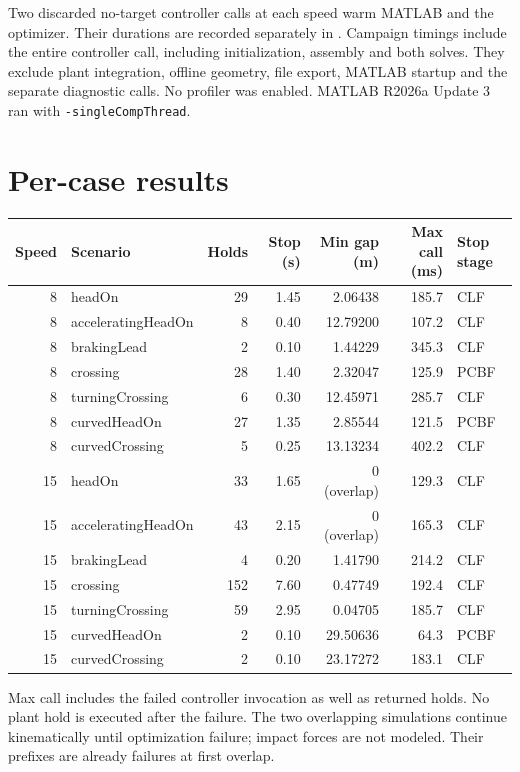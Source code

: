 \documentclass[11pt]{article}
\begin{document}
Two discarded no-target controller calls at each speed warm MATLAB and the
optimizer. Their durations are recorded separately in .
Campaign timings include the entire controller call, including initialization,
assembly and both solves. They exclude plant integration, offline geometry,
file export, MATLAB startup and the separate diagnostic calls. No profiler
was enabled. MATLAB R2026a Update 3 ran with \texttt{-singleCompThread}.

\section{Per-case results}
\begin{center}\small
\begin{tabular}{rlrrrrl}\toprule
Speed & Scenario & Holds & Stop (s) & Min gap (m) & Max call (ms) & Stop stage \\\midrule
8 & headOn & 29 & 1.45 & 2.06438 & 185.7 & CLF \\
8 & acceleratingHeadOn & 8 & 0.40 & 12.79200 & 107.2 & CLF \\
8 & brakingLead & 2 & 0.10 & 1.44229 & 345.3 & CLF \\
8 & crossing & 28 & 1.40 & 2.32047 & 125.9 & PCBF \\
8 & turningCrossing & 6 & 0.30 & 12.45971 & 285.7 & CLF \\
8 & curvedHeadOn & 27 & 1.35 & 2.85544 & 121.5 & PCBF \\
8 & curvedCrossing & 5 & 0.25 & 13.13234 & 402.2 & CLF \\\midrule
15 & headOn & 33 & 1.65 & 0 (overlap) & 129.3 & CLF \\
15 & acceleratingHeadOn & 43 & 2.15 & 0 (overlap) & 165.3 & CLF \\
15 & brakingLead & 4 & 0.20 & 1.41790 & 214.2 & CLF \\
15 & crossing & 152 & 7.60 & 0.47749 & 192.4 & CLF \\
15 & turningCrossing & 59 & 2.95 & 0.04705 & 185.7 & CLF \\
15 & curvedHeadOn & 2 & 0.10 & 29.50636 & 64.3 & PCBF \\
15 & curvedCrossing & 2 & 0.10 & 23.17272 & 183.1 & CLF \\\bottomrule
\end{tabular}
\end{center}
Max call includes the failed controller invocation as well as returned holds.
No plant hold is executed after the failure. The two overlapping simulations
continue kinematically until optimization failure; impact forces are not
modeled. Their prefixes are already failures at first overlap.
\end{document}
